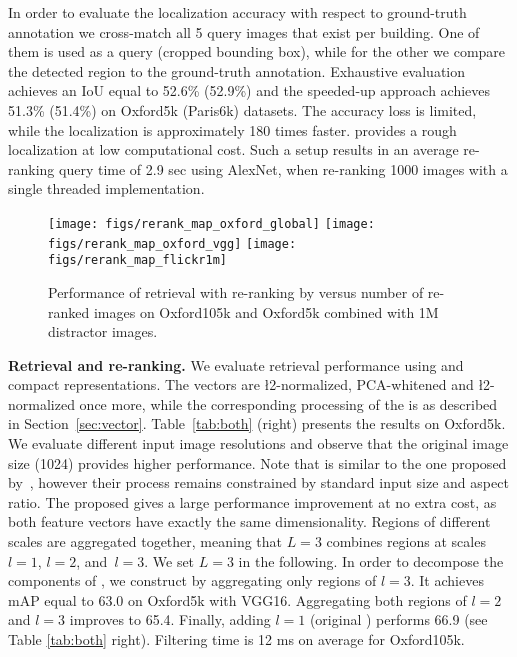 In order to evaluate the localization accuracy with respect to ground-truth annotation we cross-match all 5 query images that exist per building.
One of them is used as a query (cropped bounding box), while for the other we compare the detected region to the ground-truth annotation.
Exhaustive evaluation achieves an IoU equal to 52.6\% (52.9\%) and the speeded-up approach achieves 51.3\% (51.4\%) on Oxford5k (Paris6k) datasets.
The accuracy loss is limited, while the localization is approximately 180 times faster. 
\deeploc provides a rough localization at low computational cost.
Such a setup results in an average re-ranking query time of 2.9 sec using AlexNet, when re-ranking 1000 images with a single threaded implementation. 
\begin{figure*}
\centering
  \texttt{[image: figs/rerank\_map\_oxford\_global]}
\hfill
  \texttt{[image: figs/rerank\_map\_oxford\_vgg]}
  \hfill
 \texttt{[image: figs/rerank\_map\_flickr1m]}
\caption{Performance of retrieval with re-ranking by \deeploc versus number of re-ranked images on Oxford105k and Oxford5k combined with 1M distractor images.
\label{fig:rerank_map}}
\end{figure*}

\textbf{Retrieval and re-ranking.}
We evaluate retrieval performance using \gfv and \rfv compact representations.
The \gfv vectors are \l2-normalized, PCA-whitened and \l2-normalized once more, while the corresponding processing of the \rfv is as described in Section~\ref{sec:vector}. Table~\ref{tab:both} (right) presents the results on Oxford5k.
We evaluate different input image resolutions and observe that the original image size (1024) provides higher performance.
Note that \gfv is similar to the one proposed by~\cite{ARSM+14}, however their process remains constrained by  standard input size and aspect ratio.
The proposed \rfv gives a large performance improvement at no extra cost, as both feature vectors have exactly the same dimensionality.
Regions of different scales are aggregated together, meaning that $L=3$ combines regions at scales $l=1$, $l=2$, and~$l=3$.
We set $L=3$ in the following. 
In order to decompose the components of \rfv, we construct \rfv by aggregating only regions of $l=3$. It achieves mAP equal to 63.0 on Oxford5k with VGG16. 
Aggregating both regions of $l=2$ and $l=3$ improves to 65.4.
Finally, adding $l=1$ (original \rfv) performs 66.9 (see Table \ref{tab:both} right).
Filtering time is 12 ms on average for Oxford105k. 

